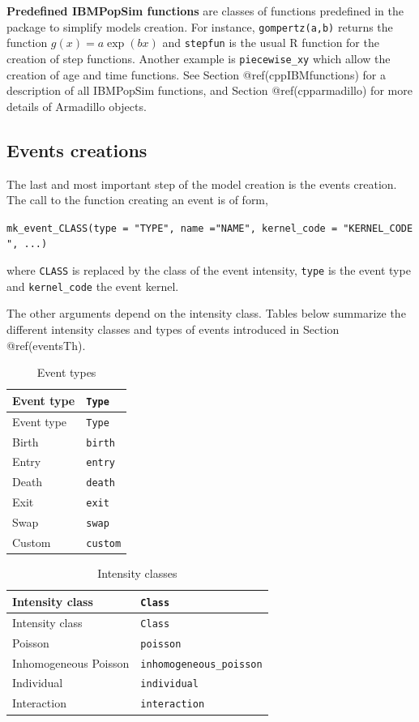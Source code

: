 \textbf{Predefined IBMPopSim functions} are classes of functions predefined in the package to simplify models creation. For instance, \texttt{gompertz(a,b)} returns the function \(g(x) = a \exp(bx)\) and \texttt{stepfun} is the usual R function for the creation of step functions. Another example is \texttt{piecewise\_xy} which allow the creation of age and time functions. See Section @ref(cppIBMfunctions) for a description of all IBMPopSim functions, and Section @ref(cpparmadillo) for more details of Armadillo objects.

\hypertarget{events}{%
\subsection{Events creations}\label{events}}

The last and most important step of the model creation is the events creation. The call to the function creating an event is of form,

\texttt{mk\_event\_CLASS(type\ =\ "TYPE",\ name\ ="NAME",\ kernel\_code\ =\ "KERNEL\_CODE",\ ...)}

where \texttt{CLASS} is replaced by the class of the event intensity, \texttt{type} is the event type and \texttt{kernel\_code} the event kernel.

The other arguments depend on the intensity class. Tables below summarize the different intensity classes and types of events introduced in Section @ref(eventsTh).

\begin{longtable}[]{@{}ll@{}}
\caption{Event types}\tabularnewline
\toprule
Event type & \texttt{Type}\tabularnewline
\midrule
\endfirsthead
\toprule
Event type & \texttt{Type}\tabularnewline
\midrule
\endhead
Birth & \texttt{birth}\tabularnewline
Entry & \texttt{entry}\tabularnewline
Death & \texttt{death}\tabularnewline
Exit & \texttt{exit}\tabularnewline
Swap & \texttt{swap}\tabularnewline
Custom & \texttt{custom}\tabularnewline
\bottomrule
\end{longtable}

\begin{longtable}[]{@{}ll@{}}
\caption{Intensity classes}\tabularnewline
\toprule
Intensity class & \texttt{Class}\tabularnewline
\midrule
\endfirsthead
\toprule
Intensity class & \texttt{Class}\tabularnewline
\midrule
\endhead
Poisson & \texttt{poisson}\tabularnewline
Inhomogeneous Poisson & \texttt{inhomogeneous\_poisson}\tabularnewline
Individual & \texttt{individual}\tabularnewline
Interaction & \texttt{interaction}\tabularnewline
\bottomrule
\end{longtable}

